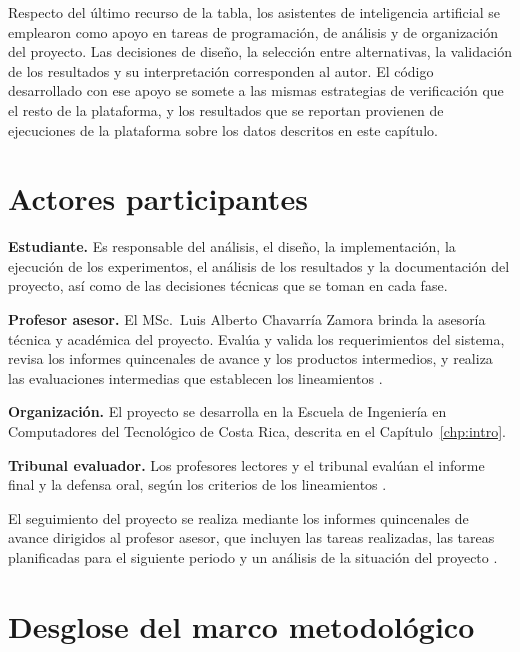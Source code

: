 Respecto del último recurso de la tabla, los asistentes de inteligencia artificial se emplearon como apoyo en tareas de programación, de análisis y de organización del proyecto.
Las decisiones de diseño, la selección entre alternativas, la validación de los resultados y su interpretación corresponden al autor.
El código desarrollado con ese apoyo se somete a las mismas estrategias de verificación que el resto de la plataforma, y los resultados que se reportan provienen de ejecuciones de la plataforma sobre los datos descritos en este capítulo.

\section{Actores participantes}
\label{sec:met-actores}

\textbf{Estudiante.}
Es responsable del análisis, el diseño, la implementación, la ejecución de los experimentos, el análisis de los resultados y la documentación del proyecto, así como de las decisiones técnicas que se toman en cada fase.

\textbf{Profesor asesor.}
El MSc.\ Luis Alberto Chavarría Zamora brinda la asesoría técnica y académica del proyecto.
Evalúa y valida los requerimientos del sistema, revisa los informes quincenales de avance y los productos intermedios, y realiza las evaluaciones intermedias que establecen los lineamientos \cite{tec_lineamientos_tfg}.

\textbf{Organización.}
El proyecto se desarrolla en la Escuela de Ingeniería en Computadores del Tecnológico de Costa Rica, descrita en el Capítulo~\ref{chp:intro}.

\textbf{Tribunal evaluador.}
Los profesores lectores y el tribunal evalúan el informe final y la defensa oral, según los criterios de los lineamientos \cite{tec_lineamientos_tfg}.

El seguimiento del proyecto se realiza mediante los informes quincenales de avance dirigidos al profesor asesor, que incluyen las tareas realizadas, las tareas planificadas para el siguiente periodo y un análisis de la situación del proyecto \cite{tec_lineamientos_tfg}.

\section{Desglose del marco metodológico}
\label{sec:met-desglose}

